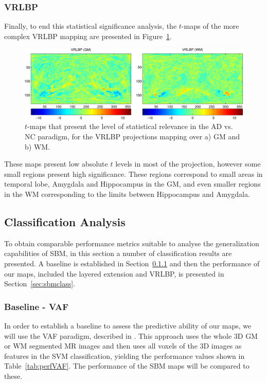 \subsubsection{VRLBP}\label{sec:vrlbpttest}
Finally, to end this statistical significance analysis, the $t$-maps of the more complex VRLBP mapping are presented in Figure~\ref{fig:tmapvrlbp}.

\begin{figure}[htp]
	\centering
	\includegraphics[width=\textwidth]{Graphics/ch6/09-tmaps_vrlbp}
	\caption{$t$-maps that present the level of statistical relevance in the AD vs. NC paradigm, for the VRLBP projections mapping over a) \ac{GM} and b) \ac{WM}. }
	\label{fig:tmapvrlbp}
\end{figure}

These maps present low absolute $t$ levels in most of the projection, however some small regions present high significance. These regions correspond to small areas in temporal lobe, Amygdala and Hippocampus in the \ac{GM}, and even smaller regions in the \ac{WM} corresponding to the limits between Hippocampus and Amygdala. 

\subsection{Classification Analysis}\label{sec:classification}
To obtain comparable performance metrics suitable to analyse the generalization capabilities of \ac{SBM}, in this section a number of classification results are presented. A baseline is established in Section~\ref{sec:baseline} and then the performance of our maps, included the layered extension and VRLBP, is presented in Section~\ref{sec:sbmclass}.

\subsubsection{Baseline - VAF}\label{sec:baseline}
In order to establish a baseline to assess the predictive ability of our maps, we will use the \acf{VAF} paradigm, described in \cite{Stoeckel04}. This approach uses the whole 3D \ac{GM} or \ac{WM} segmented MR images and then uses all voxels of the 3D images as features in the SVM classification, yielding the performance values shown in Table~\ref{tab:perfVAF}. The performance of the \ac{SBM} maps will be compared to these. 

